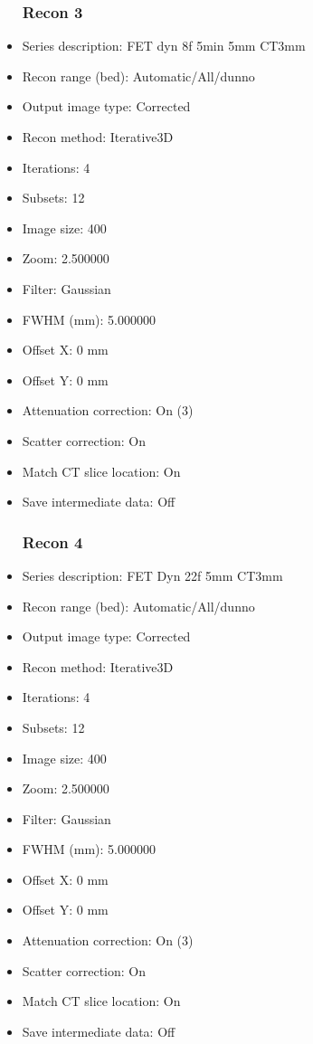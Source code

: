 \documentclass[12pt]{article}
\begin{document}
\begin{itemize}
\subsubsection{Recon 3}
\item Series description: FET dyn 8f 5min 5mm CT3mm
\item Recon range (bed): Automatic/All/dunno
\item Output image type: Corrected
\item Recon method: Iterative3D
\item Iterations: 4
\item Subsets: 12
\item Image size: 400
\item Zoom: 2.500000
\item Filter: Gaussian
\item FWHM (mm): 5.000000
\item Offset X: 0 mm
\item Offset Y: 0 mm
\item Attenuation correction: On (3)
\item Scatter correction: On
\item Match CT slice location: On
\item Save intermediate data: Off
\subsubsection{Recon 4}
\item Series description: FET Dyn 22f 5mm CT3mm
\item Recon range (bed): Automatic/All/dunno
\item Output image type: Corrected
\item Recon method: Iterative3D
\item Iterations: 4
\item Subsets: 12
\item Image size: 400
\item Zoom: 2.500000
\item Filter: Gaussian
\item FWHM (mm): 5.000000
\item Offset X: 0 mm
\item Offset Y: 0 mm
\item Attenuation correction: On (3)
\item Scatter correction: On
\item Match CT slice location: On
\item Save intermediate data: Off

\end{itemize}
\end{document}
